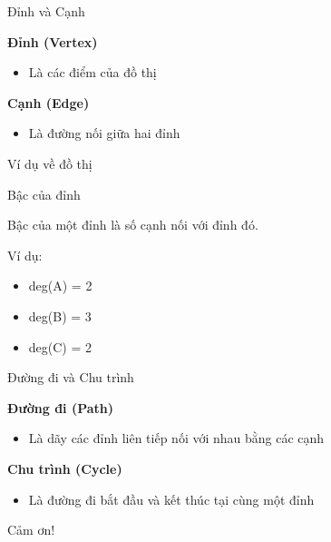 \documentclass{beamer}
\begin{document}
\begin{frame}{Đỉnh và Cạnh}

\textbf{Đỉnh (Vertex)}

\begin{itemize}
\item Là các điểm của đồ thị
\end{itemize}

\textbf{Cạnh (Edge)}

\begin{itemize}
\item Là đường nối giữa hai đỉnh
\end{itemize}

\end{frame}


\begin{frame}{Ví dụ về đồ thị}

\begin{center}


\end{center}

\end{frame}


\begin{frame}{Bậc của đỉnh}

Bậc của một đỉnh là số cạnh nối với đỉnh đó.

Ví dụ:

\begin{itemize}
\item deg(A) = 2
\item deg(B) = 3
\item deg(C) = 2
\end{itemize}

\end{frame}


\begin{frame}{Đường đi và Chu trình}

\textbf{Đường đi (Path)}

\begin{itemize}
\item Là dãy các đỉnh liên tiếp nối với nhau bằng các cạnh
\end{itemize}

\textbf{Chu trình (Cycle)}

\begin{itemize}
\item Là đường đi bắt đầu và kết thúc tại cùng một đỉnh
\end{itemize}

\end{frame}


\begin{frame}

\centering
\Huge Cảm ơn!

\end{frame}
\end{document}
